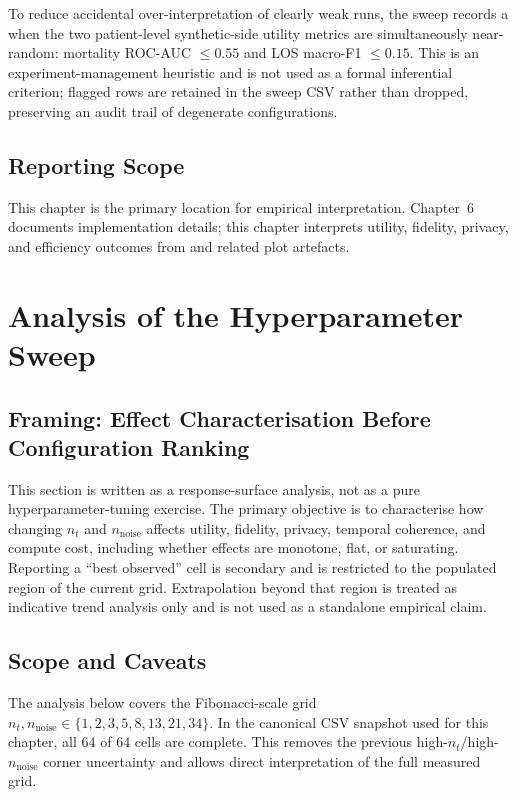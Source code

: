 To reduce accidental over-interpretation of clearly weak runs, the sweep records a  when the two patient-level synthetic-side utility metrics are simultaneously near-random: mortality ROC-AUC $\leq 0.55$ and LOS macro-F1 $\leq 0.15$. This is an experiment-management heuristic and is not used as a formal inferential criterion; flagged rows are retained in the sweep CSV rather than dropped, preserving an audit trail of degenerate configurations.

\subsection{Reporting Scope}

This chapter is the primary location for empirical interpretation. Chapter~6 documents implementation details; this chapter interprets utility, fidelity, privacy, and efficiency outcomes from  and related plot artefacts.

\section{Analysis of the Hyperparameter Sweep}

\subsection{Framing: Effect Characterisation Before Configuration Ranking}

This section is written as a response-surface analysis, not as a pure hyperparameter-tuning exercise. The primary objective is to characterise how changing $n_t$ and $n_{\text{noise}}$ affects utility, fidelity, privacy, temporal coherence, and compute cost, including whether effects are monotone, flat, or saturating. Reporting a ``best observed'' cell is secondary and is restricted to the populated region of the current grid. Extrapolation beyond that region is treated as indicative trend analysis only and is not used as a standalone empirical claim.

\subsection{Scope and Caveats}

The analysis below covers the Fibonacci-scale grid $n_t, n_{\text{noise}} \in \{1, 2, 3, 5, 8, 13, 21, 34\}$. In the canonical CSV snapshot used for this chapter, all $64$ of $64$ cells are complete. This removes the previous high-$n_t$/high-$n_{\text{noise}}$ corner uncertainty and allows direct interpretation of the full measured grid.

